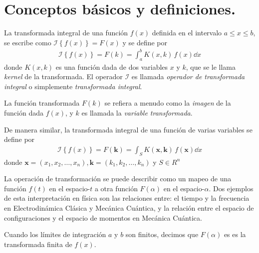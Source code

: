 \section{Conceptos básicos y definiciones.}
La transformada integral de una función $f(x)$ definida en el intervalo $a \leq x \leq b$, se escribe como $\mathscr{I} \left\{ f(x) \right\} = F(x)$ y se define por
\begin{align}
\mathscr{I} \left\{ f(x) \right\} = F(k) = \int_{a}^{b} K(x, k) \, f(x) \dd{x}
\label{eq:ecuacion_01_02_01}
\end{align}
donde $K(x, k)$ es una función dada de dos variables $x$ y $k$, que se le llama \emph{kernel} de la transformada. El operador $\mathscr{I}$ es llamada \emph{operador de transformada integral} o simplemente \emph{transformada integral}.
\par
La función transformada $F(k)$ se refiera a menudo como la \emph{imagen} de la función dada $f(x)$, y $k$ es llamada la \emph{variable transformada}.
\par
De manera similar, la transformada integral de una función de varias variables se define por
\begin{align}
\mathscr{I} \left\{ f(x) \right\} = F(\mathbf{k}) = \int_{S} K(\mathbf{x}, \mathbf{k}) \, f(\mathbf{x}) \dd{x}
\label{eq:ecuacion_01_02_02}
\end{align}
donde $\mathbf{x} = (x_{1}, x_{2}, \ldots, x_{n}), \mathbf{k} = (k_{1}, k_{2}, \ldots, k_{n})$ y $S \in R^{n}$
\par
La operación de transformación se puede describir como un mapeo de una función $f(t)$ en el espacio-$t$ a otra función $F (\alpha)$ en el espacio-$\alpha$. Dos ejemplos de esta interpretación en física son las relaciones entre: el tiempo y la frecuencia en Electrodinámica Clásica y Mecánica Cuántica, y la relación entre el espacio de configuraciones y el espacio de momentos en Mecánica Cuántica.
\par
Cuando los límites de integración $a$ y $b$ son finitos, decimos que $F(\alpha)$ es es la transformada finita de $f(x)$. 

